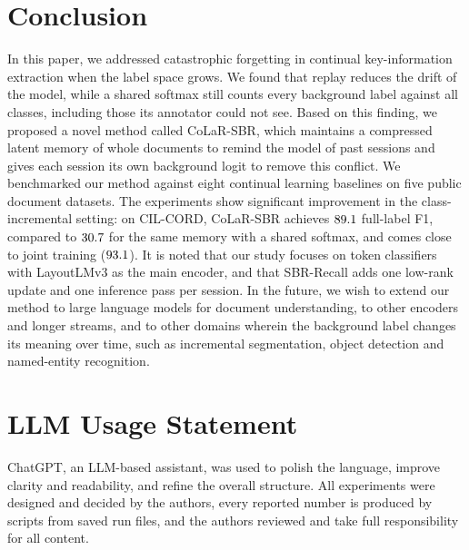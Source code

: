 \documentclass[10pt,twocolumn,letterpaper]{article}
\newif\ifwithappendix \withappendixtrue
\begin{document}
\section{Conclusion}
\label{sec:limitations}
\label{sec:conclusion}
In this paper, we addressed catastrophic forgetting in continual key-information extraction when the label space grows. We found that replay reduces the drift of the model, while a shared softmax still counts every background label against all classes, including those its annotator could not see. Based on this finding, we proposed a novel method called CoLaR-SBR, which maintains a compressed latent memory of whole documents to remind the model of past sessions and gives each session its own background logit to remove this conflict. We benchmarked our method against eight continual learning baselines on five public document datasets. The experiments show significant improvement in the class-incremental setting: on CIL-CORD, CoLaR-SBR achieves $89.1$ full-label F1, compared to $30.7$ for the same memory with a shared softmax, and comes close to joint training ($93.1$). It is noted that our study focuses on token classifiers with LayoutLMv3 as the main encoder, and that SBR-Recall adds one low-rank update and one inference pass per session. In the future, we wish to extend our method to large language models for document understanding, to other encoders and longer streams, and to other domains wherein the background label changes its meaning over time, such as incremental segmentation, object detection and named-entity recognition.\label{mainend}%

\section*{LLM Usage Statement}
ChatGPT, an LLM-based assistant, was used to polish the language, improve clarity and readability, and refine the overall structure. All experiments were designed and decided by the authors, every reported number is produced by scripts from saved run files, and the authors reviewed and take full responsibility for all content.
{
    \small
      {}
}

\ifwithappendix\clearpage{}\appendix\fi
\end{document}
